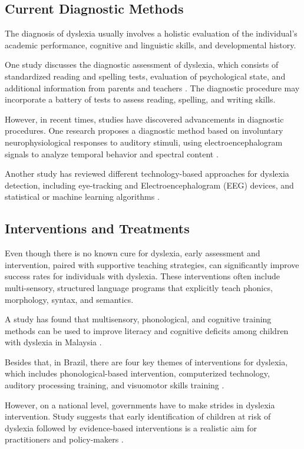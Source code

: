 \newpage
\subsection{Current Diagnostic Methods}
The diagnosis of dyslexia usually involves a holistic evaluation of the individual's academic performance, cognitive and linguistic skills, and developmental history. 

One study discusses the diagnostic assessment of dyslexia, which consists of standardized reading and spelling tests, evaluation of psychological state, and additional information from parents and teachers \parencite{SchulteKrne2010}. The diagnostic procedure may incorporate a battery of tests to assess reading, spelling, and writing skills. 

However, in recent times, studies have discovered advancements in diagnostic procedures. One research proposes a diagnostic method based on involuntary neurophysiological responses to auditory stimuli, using electroencephalogram signals to analyze temporal behavior and spectral content \parencite{Ortiz2020}. 

Another study has reviewed different technology-based approaches for dyslexia detection, including eye-tracking and Electroencephalogram (EEG) devices, and statistical or machine learning algorithms \parencite{Jankovic2022}.

\newpage
\subsection{Interventions and Treatments}
Even though there is no known cure for dyslexia, early assessment and intervention, paired with supportive teaching strategies, can significantly improve success rates for individuals with dyslexia. These interventions often include multi-sensory, structured language programs that explicitly teach phonics, morphology, syntax, and semantics. 

A study has found that multisensory, phonological, and cognitive training methods can be used to improve literacy and cognitive deficits among children with dyslexia in Malaysia \parencite{Anis2018}. 

Besides that, in Brazil, there are four key themes of interventions for dyslexia, which includes phonological-based intervention, computerized technology, auditory processing training, and visuomotor skills training \parencite{Signor2020}.

However, on a national level, governments have to make strides in dyslexia intervention. Study suggests that early identification of children at risk of dyslexia followed by evidence-based interventions is a realistic aim for practitioners and policy-makers 
\parencite{Snowling2012}. 

